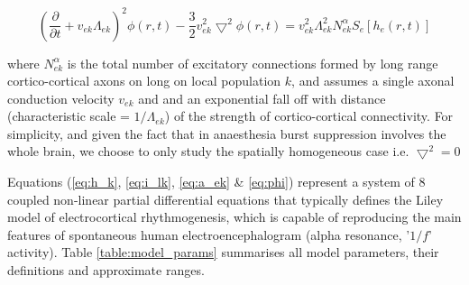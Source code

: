 \documentclass[a4paper,12pt]{article}
\begin{document}
\begin{equation} \label{eq:phi}
\left(\frac{\partial}{\partial t} + v_{ek} \Lambda_{ek} \right)^2 \phi(r,t) - \frac{3}{2} v_{ek}^2 \bigtriangledown^2\phi(r,t)=v_{ek}^2 \Lambda_{ek}^2 N_{ek}^\alpha S_e[h_e(r,t)]
\end{equation}

where $N_{ek}^\alpha$ is the total number of excitatory connections formed by
long range cortico-cortical axons on long on local population $k$, and
assumes a single axonal conduction velocity $v_{ek}$ and and an exponential fall
off with distance (characteristic scale = $1/\Lambda_{ek}$) of the strength of
cortico-cortical connectivity. For simplicity, and given the fact that in
anaesthesia burst suppression involves the whole brain, we choose to
only study the spatially homogeneous case i.e. $\bigtriangledown^2 = 0$

Equations (\ref{eq:h_k}, \ref{eq:i_lk}, \ref{eq:a_ek} \& \ref{eq:phi}) represent a system of 8 coupled non-linear partial
differential equations that typically defines the Liley model of
electrocortical rhythmogenesis, which is capable of reproducing the
main features of spontaneous human electroencephalogram (alpha
resonance, '$1/f$' activity). Table \ref{table:model_params} summarises all model parameters,
their definitions and approximate ranges. 
\end{document}
